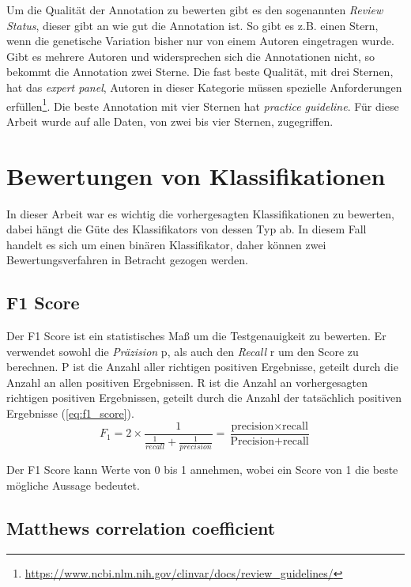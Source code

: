 Um die Qualität der Annotation zu bewerten gibt es den sogenannten \emph{Review Status}, dieser gibt an wie gut die Annotation ist. So gibt es z.B. einen Stern, wenn die genetische Variation bisher nur von einem Autoren eingetragen wurde. Gibt es mehrere Autoren und widersprechen sich die Annotationen nicht, so bekommt die Annotation zwei Sterne. Die fast beste Qualität, mit drei Sternen, hat das \emph{expert panel}, Autoren in dieser Kategorie müssen spezielle Anforderungen erfüllen\footnote{\url{https://www.ncbi.nlm.nih.gov/clinvar/docs/review_guidelines/}}. Die beste Annotation mit vier Sternen hat \emph{practice guideline}. Für diese Arbeit wurde auf alle Daten, von zwei bis vier Sternen, zugegriffen.


\section{Bewertungen von Klassifikationen}

In dieser Arbeit war es wichtig die vorhergesagten Klassifikationen zu bewerten, dabei hängt die Güte des Klassifikators von dessen Typ ab. In diesem Fall handelt es sich um einen binären Klassifikator, daher können zwei Bewertungsverfahren in Betracht gezogen werden.

\subsection{F1 Score}
Der F1 Score ist ein statistisches Maß um die Testgenauigkeit zu bewerten. Er verwendet sowohl die \emph{Präzision} p, als auch den \emph{Recall} r um den Score zu berechnen. P ist die Anzahl aller richtigen positiven Ergebnisse, geteilt durch die Anzahl an allen positiven Ergebnissen. R ist die Anzahl an vorhergesagten richtigen positiven Ergebnissen, geteilt durch die Anzahl der tatsächlich positiven Ergebnisse (\ref{eq:f1_score}). 
\begin{equation}
    F_{1} = 2 \times \frac{1}{\frac{1}{recall}+\frac{1}{precision}} = \frac{\text{precision} \times \text{recall}}{\text{Precision} + \text{recall}}
    \label{eq:f1_score}
\end{equation}

Der F1 Score kann Werte von 0 bis 1 annehmen, wobei ein Score von 1 die beste mögliche Aussage bedeutet.


\subsection{Matthews correlation coefficient}

